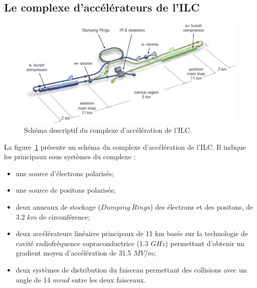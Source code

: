 \subsection{Le complexe d'accélérateurs de l'ILC}
\begin{figure}[!ht]
  \begin{center}
    \includegraphics[width=1.0\textwidth]{ILC/figs/ilc-scheme.png}
    \caption{Schéma descriptif du complexe d'accélération de l'ILC.}
    \label{fig:ilc-scheme}
  \end{center}
\end{figure}
La figure~\ref{fig:ilc-scheme} présente un schéma du complexe d'accélération de l'ILC. Il indique les principaux sous systèmes du complexe \cite{introTDR}:
\begin{itemize}
\item une source d'électrons polarisés;
\item une source de positons polarisés;
\item deux anneaux de stockage ($Dumping~Rings$) des électrons et des positons, de 3.2 $km$ de circonférence;
\item deux accélérateurs linéaires principaux de 11 km basés sur la technologie de cavité radiofréquence supraconductrice (1.3 $GHz$) permettant d'obtenir un gradient moyen d'accélération de 31.5 $MV/m$;
\item deux systèmes de distribution du faisceau permettant des collisions avec un angle de 14 $mrad$ entre les deux faisceaux.
\end{itemize}
